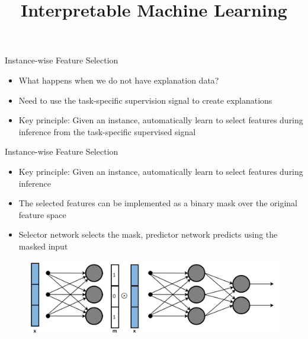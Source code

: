 \documentclass[11pt,compress,t,notes=noshow, aspectratio=169, xcolor=table]{beamer}
\title{Interpretable Machine Learning}
\date{}
\begin{document}
	\graphicspath{ {./figure/} }

\newcommand{\titlefigure}{figure/bild16}
\newcommand{\learninggoals}{
\item Optimization problems in hard-masking
\item Generative masking
\item Sampling-based instance-wise feature selection}


 
\begin{frame}[c]{Instance-wise Feature Selection}
    \begin{itemize}
        \item What happens when we do not have explanation data?
        \bigskip
        \item Need to use the task-specific supervision signal to create explanations
        \bigskip
        \item Key principle: Given an instance, automatically learn to select features during inference
from the task-specific supervised signal
    \end{itemize}
\end{frame}	
	
\begin{frame}{Instance-wise Feature Selection}
    \begin{itemize}
        \item Key principle: Given an instance, automatically learn to select features during inference
        \item The selected features can be implemented as a binary mask over the original feature
space
\item Selector network selects the mask, predictor network predicts using the masked input
    \end{itemize}
    \begin{figure}
        \centering
        \includegraphics[scale=.45]{bild16}
    \end{figure}
\end{frame}
	
\end{document}
